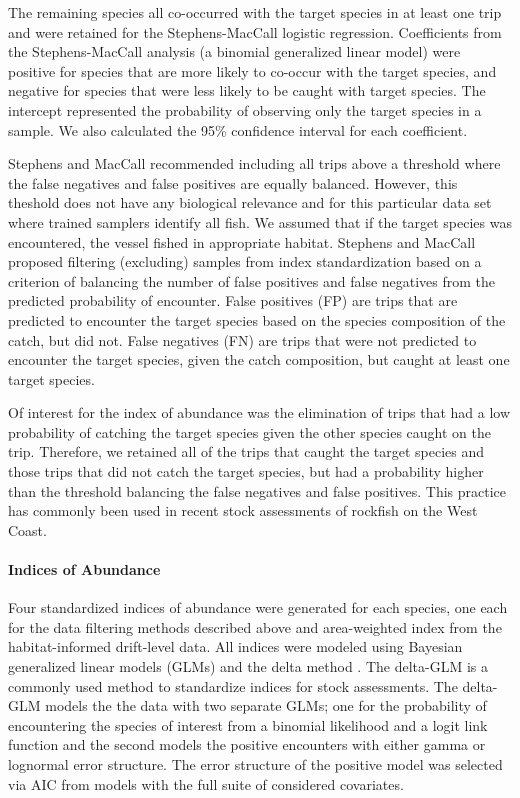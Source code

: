 \documentclass[
  authoryear,
  preprint,
  3p]{elsarticle}
\let\oldparagraph\paragraph
\renewcommand{\paragraph}[1]{\oldparagraph{#1}\mbox{}}
\begin{document}
The remaining species all co-occurred with the target species in at
least one trip and were retained for the Stephens-MacCall logistic
regression. Coefficients from the Stephens-MacCall analysis (a binomial
generalized linear model) were positive for species that are more likely
to co-occur with the target species, and negative for species that were
less likely to be caught with target species. The intercept represented
the probability of observing only the target species in a sample. We
also calculated the 95\% confidence interval for each coefficient.

Stephens and MacCall \citeyearpar{Stephens:2004:MAS} recommended
including all trips above a threshold where the false negatives and
false positives are equally balanced. However, this theshold does not
have any biological relevance and for this particular data set where
trained samplers identify all fish. We assumed that if the target
species was encountered, the vessel fished in appropriate habitat.
Stephens and MacCall \citeyearpar{Stephens:2004:MAS} proposed filtering
(excluding) samples from index standardization based on a criterion of
balancing the number of false positives and false negatives from the
predicted probability of encounter. False positives (FP) are trips that
are predicted to encounter the target species based on the species
composition of the catch, but did not. False negatives (FN) are trips
that were not predicted to encounter the target species, given the catch
composition, but caught at least one target species.

Of interest for the index of abundance was the elimination of trips that
had a low probability of catching the target species given the other
species caught on the trip. Therefore, we retained all of the trips that
caught the target species and those trips that did not catch the target
species, but had a probability higher than the threshold balancing the
false negatives and false positives. This practice has commonly been
used in recent stock assessments of rockfish on the West Coast.

\hypertarget{indices-of-abundance}{%
\paragraph{Indices of Abundance}\label{indices-of-abundance}}

Four standardized indices of abundance were generated for each species,
one each for the data filtering methods described above and
area-weighted index from the habitat-informed drift-level data. All
indices were modeled using Bayesian generalized linear models (GLMs) and
the delta method \citep{Lo:1992:IRA}. The delta-GLM is a commonly used
method to standardize indices for stock assessments. The delta-GLM
models the the data with two separate GLMs; one for the probability of
encountering the species of interest from a binomial likelihood and a
logit link function and the second models the positive encounters with
either gamma or lognormal error structure. The error structure of the
positive model was selected via AIC from models with the full suite of
considered covariates.
\end{document}
